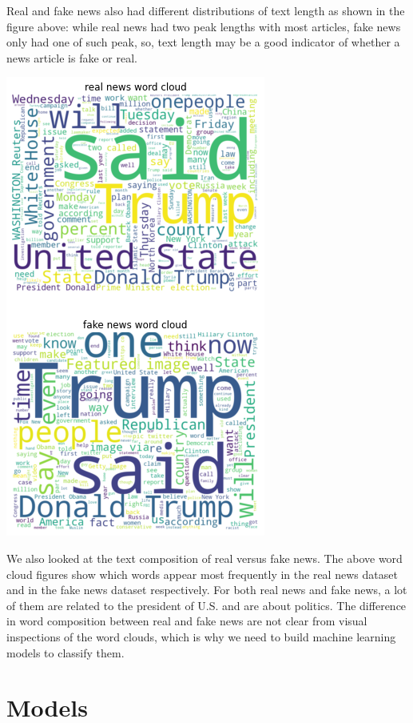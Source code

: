 \documentclass{article}
\begin{document}
\begin{multicols}{2}
Real and fake news also had different distributions of text length as shown in the figure above: while real news had two peak lengths with most articles, fake news only had one of such peak, so, text length may be a good indicator of whether a news article is fake or real.  


\begin{center}
\includegraphics[scale=0.55]{images/wd2.png}
\end{center}

We also looked at the text composition of real versus fake news. The above word cloud figures show which words appear most frequently in the real news dataset and in the fake news dataset respectively. For both real news and fake news, a lot of them are related to the president of U.S. and are about politics. The difference in word composition between real and fake news are not clear from visual inspections of the word clouds, which is why we need to build machine learning models to classify them.


\section{Models}

\end{multicols}
\end{document}
